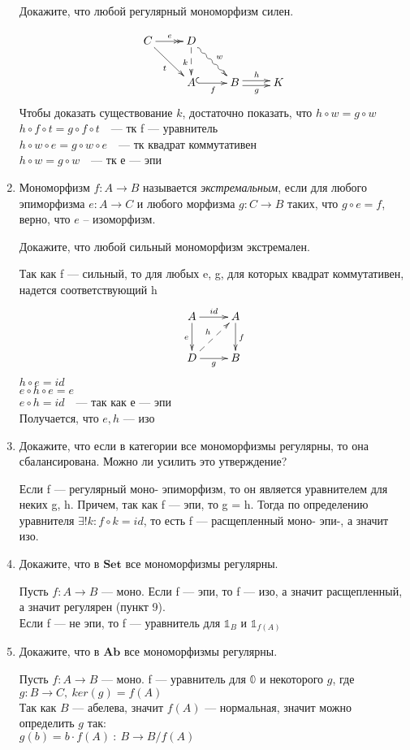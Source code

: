 \documentclass[draft]{article}
\newcommand{\cat}[1]{\mathbf{#1}}
\newcommand{\Set}{\cat{Set}}
\newcommand{\Ab}{\cat{Ab}}
\begin{document}
\begin{enumerate}
Докажите, что любой регулярный мономорфизм силен.

\[ \xymatrix{ 
C \ar@{->>}[r]^e \ar[dr]_t & D \ar@{~>}[dr]^w \ar@{-->}[d]_k &   & \\
  & A \ar@{^{(}->}[r]_f & B \ar@<-0.5ex>[r]_g \ar@<0.5ex>[r]^h & K
 } \]
Чтобы доказать существование $k$, достаточно показать, что $h\circ w = g \circ w$\\
$h\circ f \circ t = g \circ f \circ t~~~$ --- тк f --- уравнитель\\
$h\circ w \circ e = g \circ w \circ e~~~$ --- тк квадрат коммутативен\\
$h\circ w = g \circ w~~~$ --- тк е --- эпи

\item Мономорфизм $f : A \to B$ называется \emph{экстремальным}, если для любого эпиморфизма $e : A \to C$ и любого морфизма $g : C \to B$ таких, что $g \circ e = f$, верно, что $e$ -- изоморфизм.

Докажите, что любой сильный мономорфизм экстремален.

Так как f --- сильный, то для любых e, g, для которых квадрат коммутативен, надется соответствующий h
\[ \xymatrix{ A \ar[r]^{id} \ar[d]_e      & A \ar[d]^f \\
              D \ar[r]_g \ar@{-->}[ur]^h & B
            } \]
$h \circ e = id$\\
$e \circ h \circ e = e$\\
$e \circ h = id~~~$ --- так как е --- эпи\\
Получается, что $e, h$ --- изо

\item Докажите, что если в категории все мономорфизмы регулярны, то она сбалансирована. Можно ли усилить это утверждение?

Если f --- регулярный моно- эпиморфизм, то он является уравнителем для неких g, h. Причем, так как f --- эпи, то g = h. Тогда по определению уравнителя $\exists!k: f \circ k = id$, то есть f --- расщепленный моно- эпи-, а значит изо.

\item Докажите, что в $\Set$ все мономорфизмы регулярны.

Пусть $f : A \to B$ --- моно. Если f --- эпи, то f --- изо, а значит расщепленный, а значит регулярен (пункт 9). \\
Если f --- не эпи, то f --- уравнитель для $\mathbb{1}_B$ и $\mathbb{1}_{f(A)}$

\item Докажите, что в $\Ab$ все мономорфизмы регулярны.

Пусть $f : A \to B$ --- моно. f --- уравнитель для $\mathbb{0}$ и некоторого $g$, где $g: B \to C, ~ker(g) = f(A)$\\
Так как $B$ --- абелева, значит $f(A)$ --- нормальная, значит можно определить $g$ так:\\
$g (b) = b\cdot f(A) ~:~ B \to B/f(A)$ 

\end{enumerate}
\end{document}
